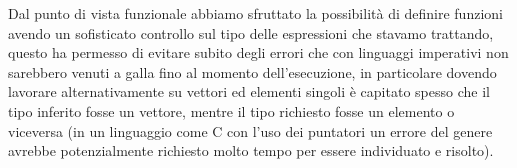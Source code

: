 Dal punto di vista funzionale abbiamo sfruttato la possibilità di definire funzioni avendo un sofisticato controllo sul tipo delle espressioni che stavamo trattando, questo ha permesso di evitare subito degli errori che con linguaggi imperativi non sarebbero venuti a galla fino al momento dell'esecuzione, in particolare dovendo lavorare alternativamente su vettori ed elementi singoli è capitato spesso che il tipo inferito fosse un vettore, mentre il tipo richiesto fosse un elemento o viceversa (in un linguaggio come C con l'uso dei puntatori un errore del genere avrebbe potenzialmente richiesto molto tempo per essere individuato e risolto).